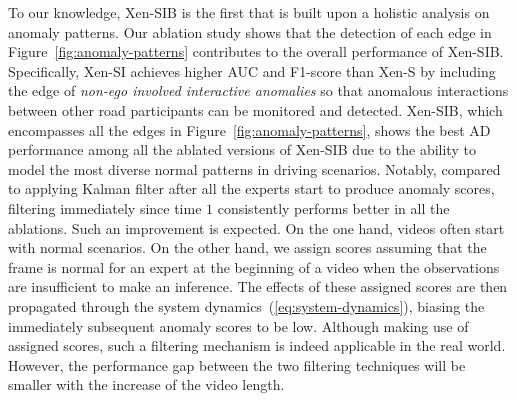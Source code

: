 To our knowledge, Xen-SIB is the first that is built upon a holistic analysis on anomaly patterns. Our ablation study shows that the detection of each edge in Figure~\ref{fig:anomaly-patterns} contributes to the overall performance of Xen-SIB. Specifically, Xen-SI achieves higher AUC and F1-score than Xen-S by including the edge of \textit{non-ego involved interactive anomalies} so that anomalous interactions between other road participants can be monitored and detected. Xen-SIB, which encompasses all the edges in Figure~\ref{fig:anomaly-patterns}, shows the best AD performance among all the ablated versions of Xen-SIB due to the ability to model the most diverse normal patterns in driving scenarios. Notably, compared to applying Kalman filter after all the experts start to produce anomaly scores, filtering immediately since time $1$ consistently performs better in all the ablations. Such an improvement is expected. On the one hand, videos often start with normal scenarios. On the other hand, we assign scores assuming that the frame is normal for an expert at the beginning of a video when the observations are insufficient to make an inference. The effects of these assigned scores are then propagated through the system dynamics~(\ref{eq:system-dynamics}), biasing the immediately subsequent anomaly scores to be low. Although making use of assigned scores, such a filtering mechanism is indeed applicable in the real world. However, the performance gap between the two filtering techniques will be smaller with the increase of the video length.

